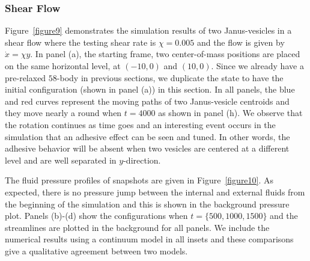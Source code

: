 \documentclass[lineno]{jfm}
\begin{document}
\subsubsection{Shear Flow}


Figure~\ref{figure9} demonstrates the simulation results of two Janus-vesicles in a shear flow where the testing shear rate is $\chi=0.005$ and the flow is given by $\dot x = \chi y$. 
In panel (a), the starting frame, two center-of-mass positions are placed 
on the same horizontal level, at $(-10,0)$ and $(10,0)$. Since we already have a pre-relaxed $58$-body in previous sections, we duplicate the state to have the initial configuration (shown in panel (a)) in this section. 
In all panels, the blue and red curves represent the moving paths of two Janus-vesicle centroids and they move nearly a round when $t=4000$ as shown in panel (h). 
We observe that the rotation continues as time goes and an interesting event occurs in the simulation that an adhesive effect can be seen and tuned. In other words, the adhesive behavior will be absent when two vesicles are centered at a different level and are well separated in $y$-direction. 

The fluid pressure profiles of snapshots are given in Figure~\ref{figure10}.
As expected, there is no pressure jump between the internal and external fluids from the beginning of the
simulation and this is shown in the background pressure plot. 
Panels (b)-(d) show the configurations when $t = \{500,1000,1500\}$ and 
the streamlines are plotted in the background for all panels. We include the numerical results using 
a continuum model in all insets and these comparisons give a qualitative agreement between two models.


\end{document}
